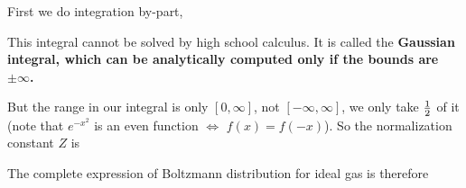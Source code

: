 \documentclass[class=article, crop=false, 12pt]{standalone}
\begin{document}
First we do integration by-part,

This integral cannot be solved by high school calculus. 
It is called the \bf{Gaussian integral},
which can be analytically computed only if the bounds are $\pm \infty$.

But the range in our integral is only $[0,\infty]$, not $[-\infty, \infty]$,
we only take $\frac{1}{2}$ of it (note that $e^{-x^2}$ is an even function $\Leftrightarrow$ $f(x)=f(-x)$).
So the normalization constant $Z$ is 

The complete expression of Boltzmann distribution for ideal gas is therefore
\end{document}
